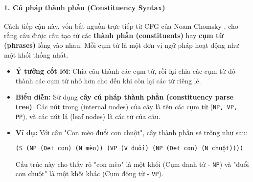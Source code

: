 \paragraph{1. Cú pháp thành phần (Constituency Syntax)}
Cách tiếp cận này, vốn bắt nguồn trực tiếp từ CFG của Noam Chomsky \cite{chomsky1956three}, cho rằng câu được cấu tạo từ các \textbf{thành phần (constituents)} hay \textbf{cụm từ (phrases)} lồng vào nhau. Mỗi cụm từ là một đơn vị ngữ pháp hoạt động như một khối thống nhất.
\begin{itemize}
    \item \textbf{Ý tưởng cốt lõi:} Chia câu thành các cụm từ, rồi lại chia các cụm từ đó thành các cụm từ nhỏ hơn cho đến khi còn lại các từ riêng lẻ.
    \item \textbf{Biểu diễn:} Sử dụng \textbf{cây cú pháp thành phần (constituency parse tree)}. Các nút trong (internal nodes) của cây là tên các cụm từ (\texttt{NP, VP, PP}), và các nút lá (leaf nodes) là các từ của câu.
    \item \textbf{Ví dụ:} Với câu "Con mèo đuổi con chuột", cây thành phần sẽ trông như sau:
    
    \begin{center}
        \texttt{(S (NP (Det con) (N mèo)) (VP (V đuổi) (NP (Det con) (N chuột))))}
    \end{center}
    
    Cấu trúc này cho thấy rõ "con mèo" là một khối (Cụm danh từ - \texttt{NP}) và "đuổi con chuột" là một khối khác (Cụm động từ - \texttt{VP}).
\end{itemize}

